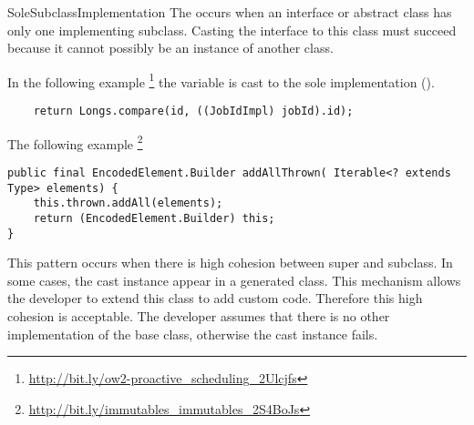 \begin{pattern}{SoleSubclassImplementation}
The \thisp{} occurs when an interface or abstract class has only one implementing subclass.
Casting the interface to this class must succeed because it cannot possibly be an instance of another class.

\instances{}
In the following example%
\footnote{\url{http://bit.ly/ow2-proactive_scheduling_2Ulcjfs}}
the  variable is cast to the sole implementation ().

\begin{verbatim}
    return Longs.compare(id, ((JobIdImpl) jobId).id);
\end{verbatim}

The following example%
\footnote{\url{http://bit.ly/immutables_immutables_2S4BoJs}}

\begin{verbatim}
public final EncodedElement.Builder addAllThrown( Iterable<? extends Type> elements) {
    this.thrown.addAll(elements);
    return (EncodedElement.Builder) this;
}
\end{verbatim}


\discussion{}
This pattern occurs when there is high cohesion between super and subclass.
In some cases, the cast instance appear in a generated class.
This mechanism allows the developer to extend this class to add custom code.
Therefore this high cohesion is acceptable.
The developer assumes that there is no other implementation of the base class,
otherwise the cast instance fails.

\end{pattern}
